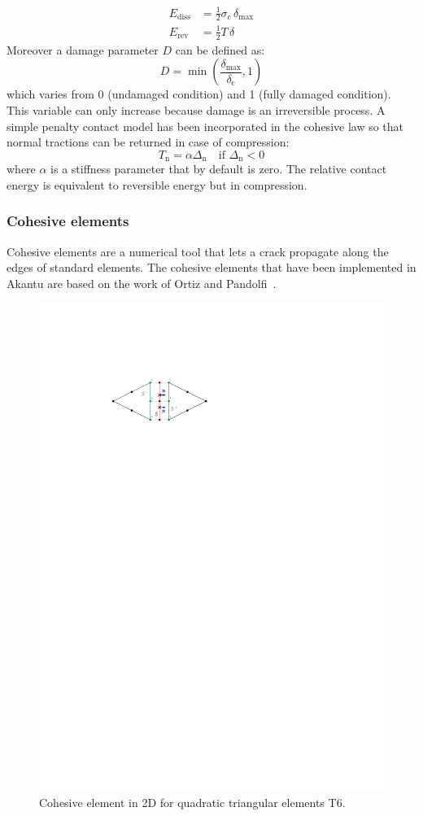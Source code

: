 \begin{align}
  E_\mathrm{diss} &= \frac{1}{2} \sigma_\mathrm{c}\, \delta_\mathrm{max}\\[1ex]
  E_\mathrm{rev} &= \frac{1}{2} T\, \delta
\end{align}
Moreover a damage parameter $D$ can be defined as:
\begin{equation}
  D = \min \left(
    \frac{\delta_\mathrm{max}}{\delta_\mathrm{c}},1 \right)
\end{equation} which varies from 0 (undamaged condition) and 1 (fully
damaged condition). This variable can only increase because damage is
an irreversible process. A simple penalty contact model has been incorporated
in the cohesive law so that normal tractions can be returned in
case of compression:
\begin{equation}
  T_\mathrm{n} = \alpha \Delta_\mathrm{n} \quad\text{if
    $\Delta_\mathrm{n} < 0$}
\end{equation}
where $\alpha$ is a stiffness parameter that by default is zero. The
relative contact energy is equivalent to reversible energy but in
compression.

\subsubsection{Cohesive elements}

Cohesive elements are a numerical tool that lets a crack propagate
along the edges of standard elements. The cohesive elements that have
been implemented in Akantu are based on the work of Ortiz and
Pandolfi~\cite{ortiz1999}.

\begin{figure}
  \centering
  \includegraphics[width=.6\textwidth]{figures/cohesive2d}
  \caption{Cohesive element in 2D for quadratic triangular elements
    T6.}
  \label{fig:smm:coh:cohesive2d}
\end{figure}

